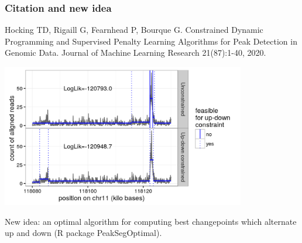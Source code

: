 \documentclass[t]{beamer}
\begin{document}
\begin{frame}
  \frametitle{Citation and new idea}
  Hocking TD, Rigaill G, Fearnhead P, Bourque G. Constrained Dynamic
  Programming and Supervised Penalty Learning Algorithms for Peak
  Detection in Genomic Data. Journal of Machine Learning Research
  21(87):1-40, 2020.

  \includegraphics[width=0.8\textwidth]{figure-data-models}

  New idea: an optimal algorithm for computing best
  changepoints which alternate up and down (R package PeakSegOptimal).

\end{frame}
\end{document}
